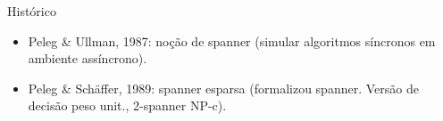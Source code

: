 \documentclass[dvipsnames]{beamer}
\begin{document}
\begin{frame}{Histórico \hyperlink{histmaior}{\beamergotobutton{$\rightarrow$}}}
  \hypertarget{hist}{}
  \begin{itemize}
    \item Peleg \& Ullman, 1987: noção de spanner (simular algoritmos síncronos em ambiente assíncrono).
    \item Peleg \& Sch\"{a}ffer, 1989: spanner esparsa (formalizou spanner. Versão de decisão peso unit., 2-spanner NP-c).
  \end{itemize}
\end{frame}


\end{document}
